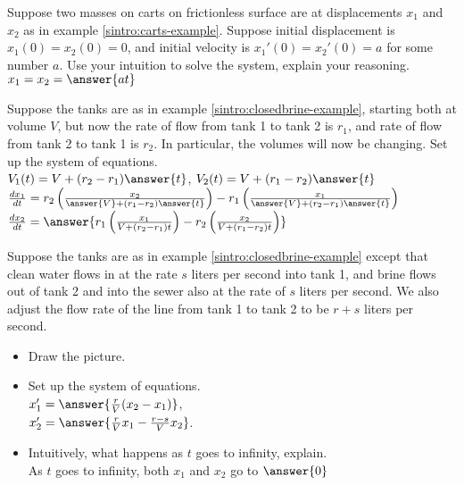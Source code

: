 \documentclass{ximera}
\begin{document}
\begin{exercise}%
    Suppose two masses on carts on frictionless surface are at  displacements $x_1$ and $x_2$ as in example \ref{sintro:carts-example}. Suppose initial displacement is $x_1(0)=x_2(0)=0$, and initial velocity is $x_1'(0) = x_2'(0) = a$ for some number $a$. Use your intuition to solve the system, explain your reasoning. $x_1 = x_2 = \answer{at}$
\end{exercise}

\begin{exercise}
    Suppose the tanks are as in example \ref{sintro:closedbrine-example}, starting both at volume $V$, but now the rate of flow from tank 1 to tank 2 is $r_1$, and rate of flow from tank 2 to tank 1 is $r_2$.  In particular, the volumes will now be changing.  Set up the system of equations.\\
    $V_1(t) = V + (r_2 - r_1)\answer{t}$, $V_2(t) = V + (r_1 - r_2)\answer{t}$ \\
    $\frac{dx_1}{dt} = r_2\left(\frac{x_2}{\answer{V} + (r_1 - r_2)\answer{t}}\right)  - r_1\left(\frac{x_1}{\answer{V} + (r_2 - r_1)\answer{t}}\right)$ \quad
    $\frac{dx_2}{dt} = \answer{r_1\left(\frac{x_1}{V + (r_2 - r_1)t}\right) - r_2\left(\frac{x_2}{V + (r_1 - r_2)t}\right)}$ \\
\end{exercise}

\begin{exercise}%
    Suppose the tanks are as in example \ref{sintro:closedbrine-example} except that clean water flows in at the rate $s$ liters per second into tank 1, and brine flows out of tank 2 and into the sewer also at the rate of $s$ liters per second. We also adjust the flow rate of the line from tank 1 to tank 2 to be $r+s$ liters per second.
    \begin{itemize}
        \item Draw the picture.
        \item Set up the system of equations.\\
            $x_1' = \answer{\frac{r}{V} (x_2-x_1)}$,\\
            $x_2' = \answer{\frac{r}{V} x_1- \frac{r-s}{V}x_2}$.
        \item Intuitively, what happens as $t$ goes to infinity, explain.\\
            As $t$ goes to infinity, both $x_1$ and $x_2$ go to $\answer{0}$
    \end{itemize}
\end{exercise}
\end{document}
